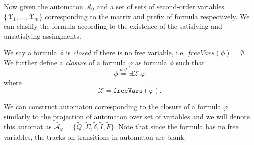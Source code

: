 % 

Now given the automaton $\mathcal{A}_0$ and a set of sets of second-order
variables $\{\mathcal{X}_1,\ldots,\mathcal{X}_m\}$ corresponding to the matrix
and prefix of formula respectively. We can clasiffy the formula according to the
existence of the satisfying and unsatisfying assingments.

\begin{defz}
We say a formula $\phi$ is \emph{closed} if there is no free variable, i.e.
$freeVars(\phi) = \emptyset$.
We further define a \emph{closure} of a formula $\varphi$ as formula $\phi$ such that
\begin{equation}
 \phi \overset{\mathit{def}}{=} \exists\mathcal{X}. \varphi
\end{equation}
where
\begin{equation}
 \mathcal{X} = \mathtt{freeVars}(\varphi).
\end{equation}

We can construct automaton corresponding to the closure of a formula $\varphi$
similarly to the projection of automaton over set of variables and we will
denote this automat as $\widetilde{\mathcal{A_\varphi}} = \{\widetilde{Q},
\widetilde{\Sigma}, \widetilde{\delta}, \widetilde{I}, \widetilde{F}\}$. Note that since the
formula has no free variables, the tracks on transitions in automaton are blank.
\end{defz}

